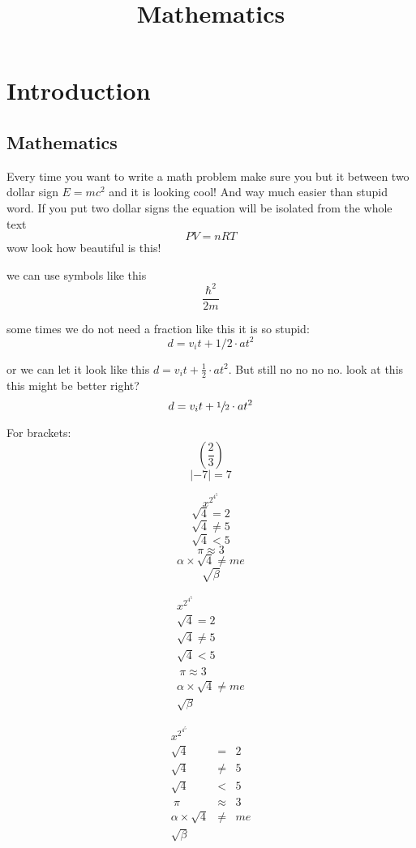 \documentclass{article}
\title{Mathematics}
\date{}
\begin{document}
\maketitle


\newpage
\section{Introduction}



\subsection{Mathematics}
Every time you want to write a math problem make sure you but it between two dollar sign $E=mc^2$ and it is looking cool!
And way much easier than stupid word. If you put two dollar signs the equation will be isolated from the whole text  $$PV=nRT$$ wow look how beautiful is this!  

we can use symbols like this $$\frac{\hbar^2}{2m}$$



some times we do not need a fraction like this it is so stupid: $$d = v_it+ 1/2 \cdot at^2$$

or we can let it look like this $d = v_it+ \frac{1}{2} \cdot at^2$. But still no no no no. 
look at this this might be better right? $$d = v_it+ \sfrac{1}{2} \cdot at^2$$

For brackets: $$\left( \frac{2}{3} \right)$$
$$\left| -7 \right| =7 $$

$$x^{2^{4^5}}$$
$$\sqrt{4} = 2$$
$$\sqrt{4} \neq 5$$
$$\sqrt{4} <5 $$
$$\pi \approx 3$$
$$\alpha \times \sqrt{4} \neq me$$
$$\sqrt{\beta}$$ 

\begin{eqnarray}
    x^{2^{4^5}} \\
    \sqrt{4} = 2 \\ 
    \sqrt{4} \neq 5 \\ 
    \sqrt{4} <5 \\\
    \pi \approx 3 \\
    \alpha \times \sqrt{4} \neq me \\
    \sqrt{\beta} 
\end{eqnarray}    

\begin{eqnarray}
    x^{2^{4^5}} \\
    \sqrt{4} &=& 2 \\ 
    \sqrt{4} &\neq& 5 \\ 
    \sqrt{4} &<&5 \\\
    \pi &\approx& 3 \\
    \alpha \times \sqrt{4} &\neq& me \\
    \sqrt{\beta} 
\end{eqnarray}    
\end{document}
